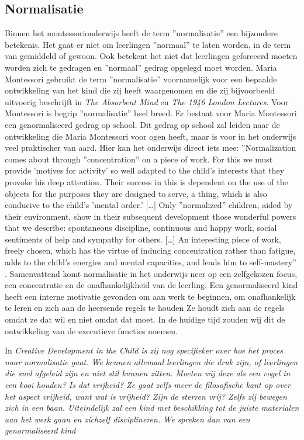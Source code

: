 \documentclass[12pt, a4paper]{article}
\begin{document}
\subsection{Normalisatie}
Binnen het montessorionderwijs heeft de term ''normalisatie'' een bijzondere betekenis. Het gaat er niet om leerlingen ''normaal'' te laten worden, in de term van gemiddeld of gewoon. Ook betekent het niet dat leerlingen geforceerd moeten worden zich te gedragen en ''normaal'' gedrag opgelegd moet worden. Maria Montessori gebruikt de term ''normalisatie'' voornamelijk voor een bepaalde ontwikkeling van het kind die zij heeft waargenomen en die zij bijvoorbeeld uitvoerig beschrijft in \emph{The Absorbent Mind} en \emph{The 1946 London Lectures}.
Voor Montessori is begrip ''normalisatie'' heel breed. Er bestaat voor Maria Montessori een genormaliseerd gedrag op school. Dit gedrag op school zal leiden naar de ontwikkeling die Maria Montessori voor ogen heeft, maar is voor in het onderwijs veel praktischer van aard. Hier kan het onderwijs direct iets mee:
''Normalization comes about through ''concentration'' on a piece of work. For this we must provide 'motives for activity' so well adapted to the child’s interests that they provoke his deep attention. Their success in this is dependent on the use of the objects for the purposes they are designed to serve, a thing, which is also conducive to the child’s 'mental order.' […] 
Only ''normalized'' children, aided by their environment, show in their subsequent development those wonderful powers that we describe: spontaneous discipline, continuous and happy work, social sentiments of help and sympathy for others. […] An interesting 
piece of work, freely chosen, which has the virtue of inducing concentration rather than fatigue, adds to the child’s energies and mental capacities, and leads him to self-mastery'' \cite[pp. 185-186]{Montessori2016}. Samenvattend komt normalisatie in het onderwijs neer op een zelfgekozen focus, een concentratie en de onafhankelijkheid van de leerling. Een genormaliseerd kind heeft een interne motivatie gevonden om aan werk te beginnen, om onafhankelijk te leren en zich aan de heersende regels te houden Ze houdt zich aan de regels omdat ze dat wil en niet omdat dat moet. In de huidige tijd zouden wij dit de ontwikkeling van de executieve functies noemen.

In \em Creative Development in the Child \em is zij nog specifieker over hoe het proces naar normalisatie gaat. We kennen allemaal leerlingen die druk zijn, of leerlingen die snel afgeleid zijn en niet stil kunnen zitten. Moeten wij deze als een vogel in een kooi houden? Is dat vrijheid? Ze gaat zelfs meer de filosofische kant op over het aspect vrijheid, want wat is vrijheid? Zijn de sterren vrij? Zelfs zij bewegen zich in een baan. Uiteindelijk zal een kind met beschikking tot de juiste materialen aan het werk gaan en zichzelf disciplineren. We spreken dan van een genormaliseerd kind \cite[pp. 125-132]{Montessori2020}
\end{document}
